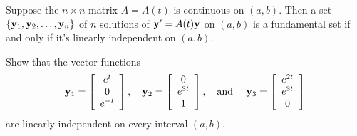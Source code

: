 \begin{theorem}
  \color{blue}
  \label{thmtype:10.3.1} Suppose the $n\times n$ matrix $A=A(t)$ is continuous on $(a,b)$. Then a
  set $\{{\bf y}_{1},{\bf y}_{2},\dots,{\bf y}_{n}\}$ of $n$ solutions of ${\bf y}'=A(t){\bf y}$ on
  $(a,b)$ is a fundamental set if and only if it's linearly independent on $(a,b)$.
\end{theorem}

\begin{example}
  \label{example:10.3.1} \rm Show that the vector functions
  \[
    {\bf y}_{1}=\left[
    \begin{array}{c}
      e^{t}  \\
      0      \\
      e^{-t}
    \end{array}\right],\quad{\bf y}_{2}=\left[
    \begin{array}{c}
      0      \\
      e^{3t} \\
      1
    \end{array}\right], \mbox{\quad and \quad}{\bf y}_{3}=\left[
    \begin{array}{c}
      e^{2t} \\
      e^{3t} \\
      0
    \end{array}\right]
  \]
  are linearly independent on every interval $(a,b)$.
\end{example}

